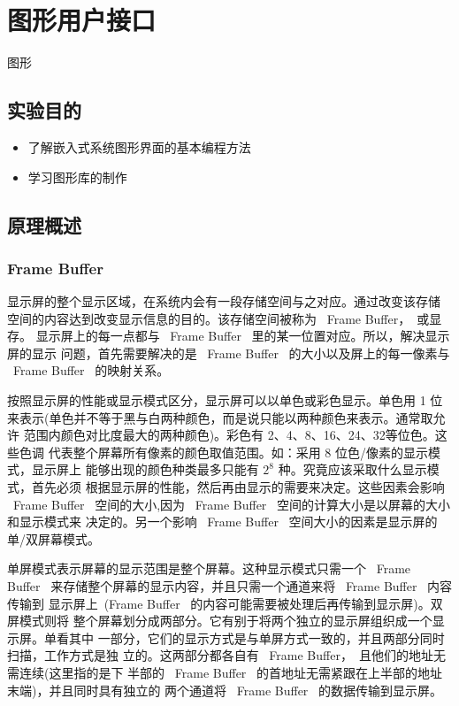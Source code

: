 \chapter{图形用户接口}{图形}

\section{实验目的}
\begin{itemize}\itemsep=-3pt
  \item 了解嵌入式系统图形界面的基本编程方法
  \item 学习图形库的制作
\end{itemize}

\section{原理概述}
\subsection{Frame Buffer}
	显示屏的整个显示区域，在系统内会有一段存储空间与之对应。通过改变该存储
空间的内容达到改变显示信息的目的。该存储空间被称为 ~Frame Buffer，~或显存。
显示屏上的每一点都与 ~Frame Buffer~ 里的某一位置对应。所以，解决显示屏的显示
问题，首先需要解决的是 ~Frame Buffer~ 的大小以及屏上的每一像素与 ~Frame
Buffer~ 的映射关系。

	按照显示屏的性能或显示模式区分，显示屏可以以单色或彩色显示。单色用 1 位
来表示(单色并不等于黑与白两种颜色，而是说只能以两种颜色来表示。通常取允许
范围内颜色对比度最大的两种颜色)。彩色有 2、4、8、16、24、32等位色。这些色调
代表整个屏幕所有像素的颜色取值范围。如：采用 8 位色/像素的显示模式，显示屏上
能够出现的颜色种类最多只能有 $2^8$ 种。究竟应该采取什么显示模式，首先必须
根据显示屏的性能，然后再由显示的需要来决定。这些因素会影响 ~Frame Buffer~
空间的大小,因为 ~Frame Buffer~ 空间的计算大小是以屏幕的大小和显示模式来
决定的。另一个影响 ~Frame Buffer~ 空间大小的因素是显示屏的单/双屏幕模式。

	单屏模式表示屏幕的显示范围是整个屏幕。这种显示模式只需一个 ~Frame Buffer~
来存储整个屏幕的显示内容，并且只需一个通道来将 ~Frame Buffer~ 内容传输到
显示屏上~(Frame Buffer~ 的内容可能需要被处理后再传输到显示屏)。双屏模式则将
整个屏幕划分成两部分。它有别于将两个独立的显示屏组织成一个显示屏。单看其中
一部分，它们的显示方式是与单屏方式一致的，并且两部分同时扫描，工作方式是独
立的。这两部分都各自有 ~Frame Buffer，~且他们的地址无需连续(这里指的是下
半部的 ~Frame Buffer~ 的首地址无需紧跟在上半部的地址末端)，并且同时具有独立的
两个通道将 ~Frame Buffer~ 的数据传输到显示屏。

